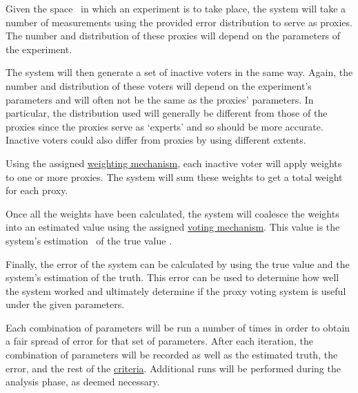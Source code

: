 \begin{enumerate}[label=\textbf{\arabic*}., leftmargin=2\parindent]
    Given the space \systemspace\ in which an experiment is to take place, the system
    will take a number of measurements using the provided error distribution to serve
    as proxies.
    The number and distribution of these proxies will depend on the
    parameters of the experiment.

    The system will then generate a set of inactive voters in the same way.
    Again, the number and distribution of these voters will depend on the
    experiment's parameters and will often not be the same as the proxies'
    parameters.
    In particular, the distribution used will generally be different from those of
    the proxies since the proxies serve as `experts' and so should be more accurate.
    Inactive voters could also differ from proxies by using different extents.

    Using the assigned \hyperref[subsec:weighting-mechanisms]{weighting mechanism},
    each inactive voter will apply weights to one or more proxies.
    The system will sum these weights to get a total weight for each proxy.

    Once all the weights have been calculated, the system will coalesce
    the weights into an estimated value using the assigned
    \hyperref[subsec:voting-mechanisms]{voting mechanism}.
    This value is the system's estimation \systemtruth\ of the true value \truth.

    Finally, the error of the system can be calculated by using the true
    value and the system's estimation of the truth.
    This error can be used to determine how well the system worked and
    ultimately determine if the proxy voting system is useful under the given
    parameters.
\end{enumerate}

Each combination of parameters will be run a number of times in order to obtain
a fair spread of error for that set of parameters.
After each iteration, the combination of parameters will be recorded as well
as the estimated truth, the error, and the rest of the
\hyperref[subsec:criteria]{criteria}.
Additional runs will be performed during the analysis phase, as deemed necessary.

